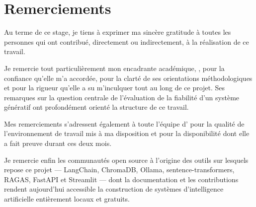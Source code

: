 \chapter*{Remerciements}
\thispagestyle{plain}

\vspace{0.5cm}

Au terme de ce stage, je tiens à exprimer ma sincère gratitude à toutes les
personnes qui ont contribué, directement ou indirectement, à la réalisation de
ce travail.

Je remercie tout particulièrement mon encadrante académique, \supervisor, pour
la confiance qu'elle m'a accordée, pour la clarté de ses orientations
méthodologiques et pour la rigueur qu'elle a su m'inculquer tout au long de ce
projet. Ses remarques sur la question centrale de l'évaluation de la fiabilité
d'un système génératif ont profondément orienté la structure de ce travail.

Mes remerciements s'adressent également à toute l'équipe d'\organism{} pour la
qualité de l'environnement de travail mis à ma disposition et pour la
disponibilité dont elle a fait preuve durant ces deux mois.

Je remercie enfin les communautés open source à l'origine des outils sur
lesquels repose ce projet --- LangChain, ChromaDB, Ollama, sentence-transformers,
RAGAS, FastAPI et Streamlit --- dont la documentation et les contributions
rendent aujourd'hui accessible la construction de systèmes d'intelligence
artificielle entièrement locaux et gratuits.

\vfill
